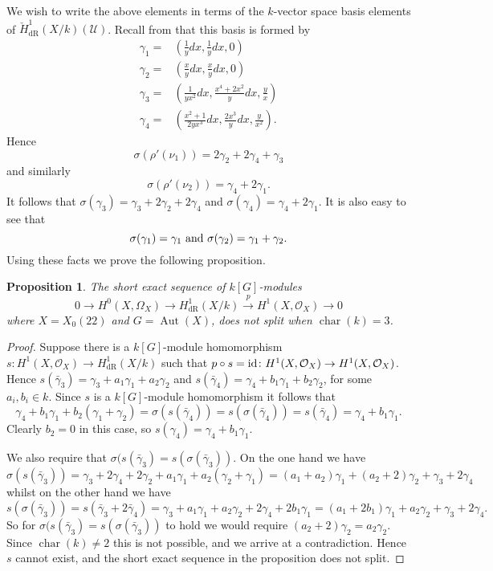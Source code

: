 \documentclass[draft, 11pt]{article} %
\theoremstyle{plain}
\newtheorem{prop}[defn]{Proposition}
\theoremstyle{remark}
\newcommand{\ra}{\rightarrow}
\newcommand{\cU}{{\mathcal U}}
\newcommand{\hzero}{{H^0(X,\Omega_X)}}
\newcommand{\hone}{H^1(X,\mathcal{O}_X)}
\newcommand{\derhamhone}{H_{\text {dR}}^1(X/k)}
\newcommand{\cechderhamhone}{\check{H}_{\text {dR}}^1(X/k)}
\DeclareMathOperator{\aut}{Aut}
\DeclareMathOperator{\cha}{char}
\begin{document}
We wish to write the above elements in terms of the $k$-vector space basis elements of $\cechderhamhone(\cU)$.
Recall from \cite{derhamactions} that this basis is formed by
\begin{align*}
\gamma_1  = & \left( \frac{1}{y}dx, \frac{1}{y}dx, 0\right) \\
\gamma_2 = & \left(\frac{x}{y}dx, \frac{x}{y}dx, 0\right) \\
\gamma_3 = & \left( \frac{1}{yx^2}dx, \frac{x^4 + 2x^2}{y}dx, \frac{y}{x} \right)\\
\gamma_4 = & \left(\frac{x^2+1}{2yx^3}dx, \frac{2x^3}{y}dx, \frac{y}{x^2} \right).
\end{align*}
Hence
\[
\sigma(\rho'(\nu_1)) = 2 \gamma_2 + 2\gamma_4 + \gamma_3
\]
and similarly
\[
\sigma(\rho'(\nu_2)) = \gamma_4 + 2 \gamma_1.
\]
It follows that $\sigma(\gamma_3) = \gamma_3 + 2\gamma_2 + 2 \gamma_4$ and $\sigma(\gamma_4) = \gamma_4 + 2\gamma_1$.
It is also easy to see that
\[
\sigma(\gamma_1) = \gamma_1 \ {\rm and} \ \sigma(\gamma_2) = \gamma_1 + \gamma_2.
\]
Using these facts we prove the following proposition.

\begin{prop}
The short exact sequence of $k[G]$-modules
\begin{equation*}
0 \ra \hzero \ra \derhamhone \xrightarrow{p} \hone \ra 0
\end{equation*}
where $X = X_0(22)$ and $G = \aut(X)$, does not split when $\cha(k) = 3$.
\end{prop}
\begin{proof}
Suppose there is a $k[G]$-module homomorphism $s\colon \hone \ra \derhamhone$ such that $p \circ s  = {\rm id} \colon \hone \ra \hone$.
Hence $s(\bar \gamma_3) = \gamma_3 + a_1 \gamma_1 + a_2 \gamma_2$ and $s(\bar \gamma_4) = \gamma_4 + b_1 \gamma_1 + b_2 \gamma_2$, for some $a_i, b_i \in k$.
Since $s$ is a $k[G]$-module homomorphism it follows that
\[
\gamma_4 + b_1\gamma_1 + b_2(\gamma_1 + \gamma_2) = \sigma (s(\bar \gamma_4)) = s ( \sigma(\bar \gamma_4)) =  s(\bar \gamma_4) = \gamma_4 + b_1\gamma_1.
\]
Clearly $b_2 = 0$ in this case, so $s(\gamma_4 ) = \gamma_4 + b_1 \gamma_1$.

We also require that $\sigma(s(\bar \gamma_3) = s (\sigma(\bar \gamma_3))$.
On the one hand we have
\[
\sigma(s(\bar \gamma_3)) = \gamma_3 + 2\gamma_4 + 2\gamma_2 + a_1\gamma_1 + a_2(\gamma_2 + \gamma_1) = (a_1 +a_2)\gamma_1 + (a_2 + 2)\gamma_2 + \gamma_3 + 2\gamma_4
\]
whilst on the other hand we have
\[
s(\sigma( \bar \gamma_3)) = s(\bar \gamma_3 + 2 \bar \gamma_4) = \gamma_3 + a_1 \gamma_1 + a_2 \gamma_2 + 2\gamma_4 + 2b_1\gamma_1 = (a_1 + 2b_1)\gamma_1 + a_2\gamma_2 + \gamma_3 + 2\gamma_4.
\]
So for $\sigma(s(\bar \gamma_3) = s (\sigma(\bar \gamma_3))$ to hold we would require $(a_2 + 2)\gamma_2 = a_2\gamma_2$.
Since $\cha(k) \neq 2$ this is not possible, and we arrive at a contradiction.
Hence $s$ cannot exist, and the short exact sequence in the proposition does not split.
\end{proof}
\end{document}
